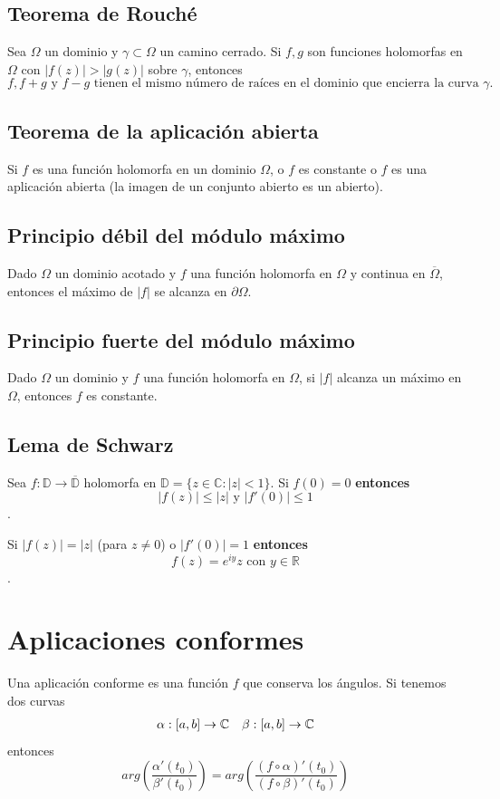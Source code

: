 \documentclass[paper=a4, fontsize=11pt]{scrartcl}
\numberwithin{equation}{section}
\numberwithin{figure}{section}
\numberwithin{table}{section}
\begin{document}
\subsection{Teorema de Rouché}
Sea $\Omega$ un dominio y $\gamma\subset\Omega$ un camino cerrado. Si $f,g$ son funciones holomorfas en $\Omega$ con $|f(z)|>|g(z)|$ sobre $\gamma$, entonces
$$f, f+g \text{ y } f-g \text{ tienen el mismo número de raíces en el dominio que encierra la curva } \gamma.$$

\subsection{Teorema de la aplicación abierta}
Si $f$ es una función holomorfa en un dominio $\Omega$, o $f$ es constante o $f$ es una aplicación abierta (la imagen de un conjunto abierto es un abierto).

\subsection{Principio débil del módulo máximo}
Dado $\Omega$ un dominio acotado y $f$ una función holomorfa en $\Omega$ y continua en $\overline{\Omega}$, entonces el máximo de $|f|$ se alcanza en $\partial\Omega$.

\subsection{Principio fuerte del módulo máximo}
Dado $\Omega$ un dominio y $f$ una función holomorfa en $\Omega$, si $|f|$ alcanza un máximo en $\Omega$, entonces $f$ es constante.

\subsection{Lema de Schwarz}
Sea $f:\mathbb{D}\to\overline{\mathbb{D}}$ holomorfa en $\mathbb{D}=\{z\in\mathbb{C}: |z|<1\}$. Si $\boxed{f(0) = 0}$ \textbf{entonces} $$\boxed{|f(z)|\le|z|}\text{ y }\boxed{|f'(0)| \le 1}$$.

Si $\boxed{|f(z)|=|z|}$ (para $z\neq 0$) o $\boxed{|f'(0)| = 1}$ \textbf{entonces} $$\boxed{f(z) = e^{iy}z}\text{ con }y\in\mathbb{R}$$.

\newpage
\section{Aplicaciones conformes}
Una aplicación conforme es una función $f$ que conserva los ángulos. Si tenemos dos curvas
$$
\begin{array}{l l}
\alpha:[a,b]\to\mathbb{C} & \beta:[a,b]\to\mathbb{C}
\end{array}
$$
entonces
$$arg\left(\frac{\alpha'(t_0)}{\beta'(t_0)}\right) = arg\left(\frac{\left(f\circ \alpha \right)'(t_0)}{\left(f\circ \beta \right)'(t_0)}\right)$$
\end{document}
